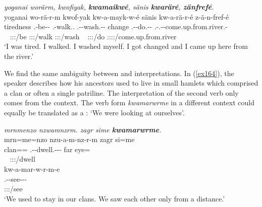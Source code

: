 \begin{exe}
	\ex \emph{yoganai worärm, kwofiyak, \textbf{kwamaikwé}, sänis \textbf{kwaräré}, \textbf{zänfrefé}.}\\
	\glll yoganai wo-rä-r-m kwof-yak kw-a-mayk-w-é sänis kw-a-rä-r-é z-ä-n-fref-é\\
	tiredness \Fsg.\Alph-be-\Lk-\Dur{} \Fsg.\Betatwo-walk.\Ext.{\Ndu} \M.\Betaone-\Vc-wash.\Ext-\Ndu-\Fsg{} change \M.\Betaone-\Vc-do.\Ext-\Lk-\Fsg{} \M.\Gam-\Vc.\Ndu-\Venit-come.up.from.river.\Rs-\Fsg\\
	~ {\footnotesize \Fsg:\Sbj:\Rpst:\Dur/be} {\footnotesize \Fsg:\Sbj:\Rpst:\Ipfv/walk} {\footnotesize \Fsg:\Sbj:\Rpst:\Ipfv/wash} ~ {\footnotesize \Fsg:\Sbj:\Rpst:\Ipfv/do} {\footnotesize \Fsg:\Sbj:\Rpst:\Pfv:\Venit/come.up.from.river}\\
	\trans `I was tired. I walked. I washed myself. I got changed and I came up here from the river.' 
	\label{ex163}
\end{exe}

We find the same ambiguity between  and  interpretations. In (\ref{ex164}), the speaker describes how his ancestors used to live in small hamlets which comprised a clan or often a single patriline. The  interpretation of the second verb only comes from the context. The verb form \emph{kwamarwrme} in a different context could equally be translated as a : `We were looking at ourselves'.

\begin{exe}
	\ex \emph{mrnmenzo nzwamnzrm. zagr sime \textbf{kwamarwrme}.}\\
	\glll mrn=me=nzo nzu-a-m-nz-r-m zagr si=me\\
	clan=\Ins={\Only} \Fnsg.\Betaone-\Vc-dwell.\Ext-\Ndu-\Lk-\Dur{} far eye={\Ins}\\
	~ {\footnotesize \Fpl:\Sbj:\Pst:\Dur/dwell} ~ ~\\
	\sn
	\glll kw-a-mar-w-r-m-e\\
	\M.\Betaone-\Vc-see-\Lk-\Dur-\Fnsg\\
	{\footnotesize \Fpl:\Sbj:\Pst:\Dur/see}\\
	\trans `We used to stay in our clans. We saw each other only from a distance.'\\ 
	\label{ex164}
\end{exe}

